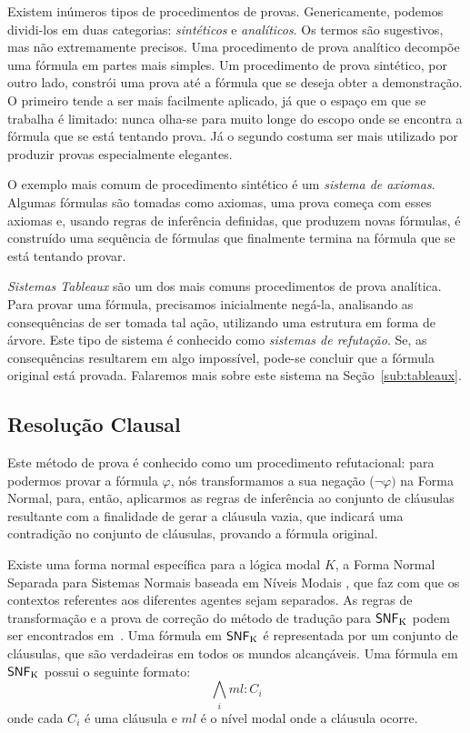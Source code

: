 Existem inúmeros tipos de procedimentos de provas. Genericamente, podemos
dividi-los em duas categorias: \textit{sintéticos} e \textit{analíticos}. Os
termos são sugestivos, mas não extremamente precisos. Uma procedimento de prova
analítico decompõe uma fórmula em partes mais simples. Um procedimento de prova
sintético, por outro lado, constrói uma prova até a fórmula que se deseja obter a
demonstração.
O primeiro tende a ser mais facilmente aplicado, já que o espaço em que se
trabalha é limitado: nunca olha-se para muito longe do escopo onde se encontra a
fórmula que se está tentando prova. Já o segundo costuma ser mais utilizado por
produzir provas especialmente elegantes.

O exemplo mais comum de procedimento sintético é um \textit{sistema de axiomas}.
Algumas fórmulas são tomadas como axiomas, uma prova começa com esses axiomas e,
usando regras de inferência definidas, que produzem novas fórmulas, é construído
uma sequência de fórmulas que finalmente termina na fórmula que se está tentando
provar.

\textit{Sistemas Tableaux} são um dos mais comuns procedimentos de prova
analítica. Para provar uma fórmula, precisamos inicialmente negá-la, analisando
as consequências de ser tomada tal ação, utilizando uma estrutura em forma de
árvore. Este tipo de sistema é conhecido como \textit{sistemas de refutação}.
Se, as consequências resultarem em algo impossível, pode-se concluir que a
fórmula original está provada. Falaremos mais sobre este sistema na
Seção~\ref{sub:tableaux}.


\subsection{Resolução Clausal}
\label{clausal}

Este método de prova é conhecido como um procedimento refutacional: para
podermos provar a fórmula $\varphi$, nós transformamos a sua negação ($\neg
\varphi)$ na Forma Normal, para, então, aplicarmos as regras de inferência ao
conjunto de cláusulas resultante com a finalidade de gerar a cláusula vazia, que
indicará uma contradição no conjunto de cláusulas, provando a fórmula original. 

Existe uma forma normal específica para a lógica modal $K$, a Forma Normal
Separada para Sistemas Normais baseada em Níveis Modais , que faz com
que os contextos referentes aos diferentes agentes sejam separados. As regras de
transformação e a prova de correção do método de tradução para ${\sf SNF}\mbox{$_{\mbox{\scriptsize K}}$}$ podem
ser encontrados em~\cite{DBLP:conf/tableaux/NalonHD15}. Uma fórmula em ${\sf SNF}\mbox{$_{\mbox{\scriptsize K}}$}$
é representada por um conjunto de cláusulas, que são verdadeiras em todos os
mundos alcançáveis.  Uma fórmula em ${\sf SNF}\mbox{$_{\mbox{\scriptsize K}}$}$ possui o seguinte formato:
\begin{equation} \bigwedge_i ml: C_i \end{equation} onde cada $C_i$ é uma
    cláusula e $ml$ é o nível modal onde a cláusula ocorre.

